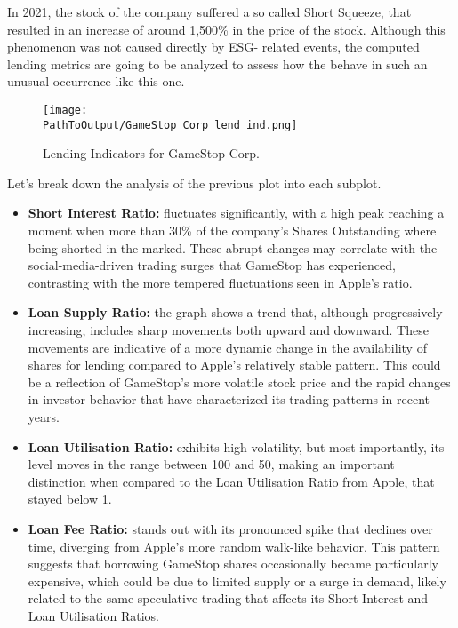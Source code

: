 In 2021, the stock of the company suffered a so called Short Squeeze, that resulted in an increase of around 1,500\% in the price of the stock. Although this phenomenon was not caused directly by ESG- related events, the computed lending metrics are going to be analyzed to assess how the behave in such an unusual occurrence like this one.

\begin{figure}[H]
	\centering
	\caption{Lending Indicators for GameStop Corp.}
	  \centering
	  \texttt{[image: \\PathToOutput/GameStop Corp\_lend\_ind.png]}
	\label{fig:gamestop_lending_indicators}
\end{figure}

Let's break down the analysis of the previous plot into each subplot.

\begin{itemize}
	\item\textbf{Short Interest Ratio:} fluctuates significantly, with a high peak reaching a moment when more than 30\% of the company's Shares Outstanding where being shorted in the marked. These abrupt changes may correlate with the social-media-driven trading surges that GameStop has experienced, contrasting with the more tempered fluctuations seen in Apple's ratio.
	\item\textbf{Loan Supply Ratio:} the graph shows a trend that, although progressively increasing, includes sharp movements both upward and downward. These movements are indicative of a more dynamic change in the availability of shares for lending compared to Apple's relatively stable pattern. This could be a reflection of GameStop's more volatile stock price and the rapid changes in investor behavior that have characterized its trading patterns in recent years.
	\item\textbf{Loan Utilisation Ratio:} exhibits high volatility, but most importantly, its level moves in the range between 100 and 50, making an important distinction when compared to the Loan Utilisation Ratio from Apple, that stayed below 1.
	\item\textbf{Loan Fee Ratio:} stands out with its pronounced spike that declines over time, diverging from Apple's more random walk-like behavior. This pattern suggests that borrowing GameStop shares occasionally became particularly expensive, which could be due to limited supply or a surge in demand, likely related to the same speculative trading that affects its Short Interest and Loan Utilisation Ratios.
\end{itemize}

